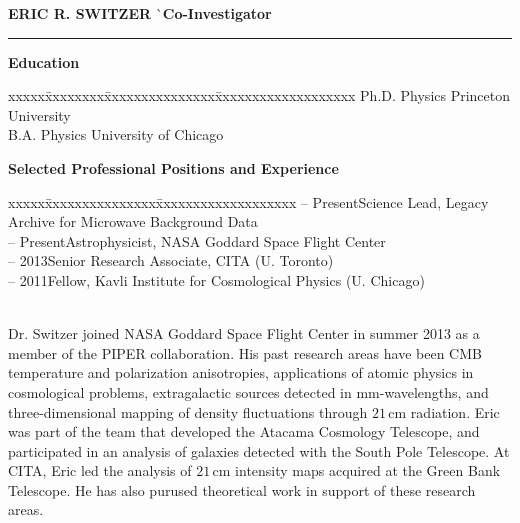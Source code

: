 \documentclass[12pt]{article}
\begin{document}
\vspace{-3mm}
\noindent
\begin{tabbing}
{\bf ERIC R. SWITZER} \` \small{{\bf Co-Investigator}} \\
\end{tabbing}
\vspace{-7mm}
\hrule height 0.7pt

\vspace{5mm}
\addressminimal{\lastupdated}

\small{
\noindent
{\bf Education}
\vspace{-3mm}
\begin{tabbing}
xxxxx\=xxxxxxxx\=xxxxxxxxxxxxxxx\=xxxxxxxxxxxxxxxxxxx\kill
{} \> Ph.D. Physics \> Princeton University \\
 \> B.A. Physics \> University of Chicago \\
\end{tabbing}}

\vspace{-5mm}
\small{
\noindent
{\bf Selected Professional Positions and Experience}
\vspace{-3mm}
\begin{tabbing}
xxxxx\=xxxxxxxxxxxxxxx\=xxxxxxxxxxxxxxxxxxx\kill
{} -- Present\>Science Lead, Legacy Archive for Microwave Background Data \\
 -- Present\>Astrophysicist, NASA Goddard Space Flight Center \\
 -- 2013\>Senior Research Associate, CITA (U. Toronto) \\
 -- 2011\>Fellow, Kavli Institute for Cosmological Physics (U. Chicago) \\
\end{tabbing}}

\vspace{-2mm} \small{ \\ Dr. Switzer joined
NASA Goddard Space Flight Center in summer 2013 as a member of the PIPER
collaboration. His past research areas have been CMB temperature and
polarization anisotropies, applications of atomic physics in cosmological
problems, extragalactic sources detected in mm-wavelengths, and
three-dimensional mapping of density fluctuations through $21$\,cm radiation. Eric
was part of the team that developed the Atacama Cosmology Telescope, and
participated in an analysis of galaxies detected with the South Pole Telescope.
At CITA, Eric led the analysis of $21$\,cm intensity maps acquired at the Green
Bank Telescope. He has also purused theoretical work in support of these
research areas.  }

\vspace{5mm}
\begin{list}{}{%
\setlength{\topsep}{0pt}%
\setlength{\leftmargin}{0.1in}%
\setlength{\listparindent}{-0.1in}%
\setlength{\itemindent}{-0.1in}%
\setlength{\parsep}{\parskip}%
}%

%
\end{list}
\end{document}
